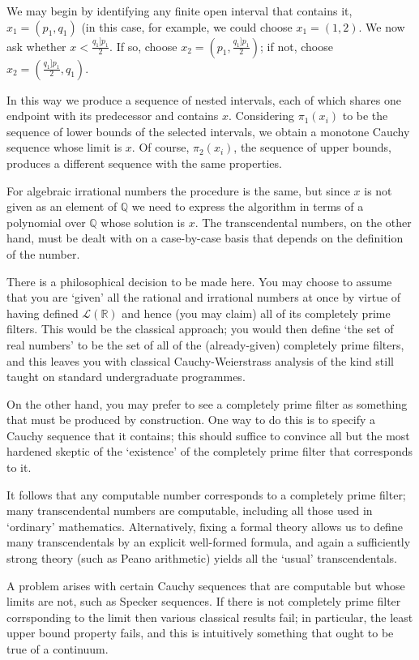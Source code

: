 \documentclass[oneside,english]{amsbook}
\numberwithin{section}{chapter}
\theoremstyle{plain}
\theoremstyle{definition}
\begin{document}
We may begin by identifying any finite open interval that contains it, $x_1=(p_1, q_1)$ (in this case, for example, we could choose $x_1=(1, 2)$. We now ask whether $x<\frac{q_1]p_1}{2}$. If so, choose $x_2=(p_1, \frac{q_1]p_1}{2})$; if not, choose $x_2=(\frac{q_1]p_1}{2}, q_1)$.

In this way we produce a sequence of nested intervals, each of which shares one endpoint with its predecessor and contains $x$. Considering $\pi_1(x_i)$ to be the sequence of lower bounds of the selected intervals, we obtain a monotone Cauchy sequence whose limit is $x$. Of course, $\pi_2(x_i)$, the sequence of upper bounds, produces a different sequence with the same properties.

For algebraic irrational numbers the procedure is the same, but since $x$ is not given as an element of $\mathbb{Q}$ we need to express the algorithm in terms of a polynomial over $\mathbb{Q}$ whose solution is $x$. The transcendental numbers, on the other hand, must be dealt with on a case-by-case basis that depends on the definition of the number. 

There is a philosophical decision to be made here. You may choose to assume that you are `given' all the rational and irrational numbers at once by virtue of having defined $\mathscr{L}(\mathbb{R})$ and hence (you may claim) all of its completely prime filters. This would be the classical approach; you would then define `the set of real numbers' to be the set of all of the (already-given) completely prime filters, and this leaves you with classical Cauchy-Weierstrass analysis of the kind still taught on standard undergraduate programmes. 

On the other hand, you may prefer to see a completely prime filter as something that must be produced by construction. One way to do this is to specify a Cauchy sequence that it contains; this should suffice to convince all but the most hardened skeptic of the `existence' of the completely prime filter that corresponds to it. 

It follows that any computable number corresponds to a completely prime filter; many transcendental numbers are computable, including all those used in `ordinary' mathematics. Alternatively, fixing a formal theory allows us to define many transcendentals by an explicit well-formed formula, and again a sufficiently strong theory (such as Peano arithmetic) yields all the `usual' transcendentals. 

A problem arises with certain Cauchy sequences that are computable but whose limits are not, such as Specker sequences. If there is not completely prime filter corrsponding to the limit then various classical results fail; in particular, the least upper bound property fails, and this is intuitively something that ought to be true of a continuum. 
\end{document}
